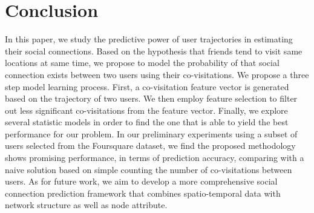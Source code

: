 \section{Conclusion} \label{sec:conclusion}

In this paper, we study the predictive power of user trajectories in estimating their social connections. Based on the hypothesis that friends tend to visit same locations at same time, we propose to model the probability of that social connection exists between two users using their co-visitations. We propose a three step model learning process. First, a co-visitation feature vector is generated based on the trajectory of two users. We then employ feature selection to filter out less significant co-visitations from the feature vector. Finally, we explore several statistic models in order to find the one that is able to yield the best performance for our problem. In our preliminary experiments using a subset of users selected from the Foursquare dataset, we find the proposed methodology shows promising performance, in terms of prediction accuracy, comparing with a naive solution based on simple counting the number of co-visitations between users. As for future work, we aim to develop a more comprehensive social connection prediction framework that combines spatio-temporal data with network structure as well as node attribute.

